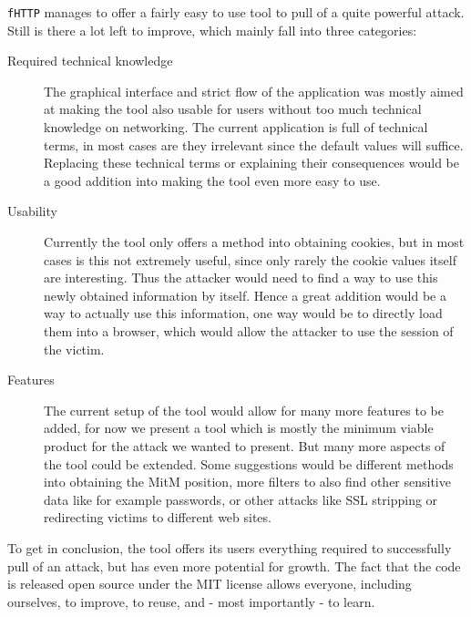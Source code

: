 \texttt{fHTTP} manages to offer a fairly easy to use tool to pull of a quite powerful attack. Still is there a lot left to improve, which mainly fall into three categories:

\begin{description}
	\item[Required technical knowledge] The graphical interface and strict flow of the application was mostly aimed at making the tool also usable for users without too much technical knowledge on networking. The current application is full of technical terms, in most cases are they irrelevant since the default values will suffice. Replacing these technical terms or explaining their consequences would be a good addition into making the tool even more easy to use.
	\item[Usability] Currently the tool only offers a method into obtaining cookies, but in most cases is this not extremely useful, since only rarely the cookie values itself are interesting. Thus the attacker would need to find a way to use this newly obtained information by itself. Hence a great addition would be a way to actually use this information, one way would be to directly load them into a browser, which would allow the attacker to use the session of the victim.
	\item[Features] The current setup of the tool would allow for many more features to be added, for now we present a tool which is mostly the minimum viable product for the attack we wanted to present. But many more aspects of the tool could be extended. Some suggestions would be different methods into obtaining the MitM position, more filters to also find other sensitive data like for example passwords, or other attacks like SSL stripping or redirecting victims to different web sites.
\end{description}

To get in conclusion, the tool offers its users everything required to successfully pull of an attack, but has even more potential for growth. The fact that the code is released open source under the MIT license allows everyone, including ourselves, to improve, to reuse, and - most importantly - to learn.